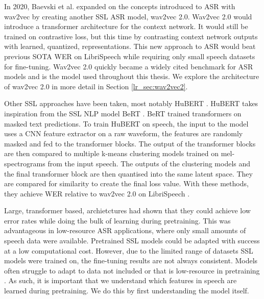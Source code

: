 In 2020, Baevski et al. \cite{wav2vec} expanded on the concepts introduced to ASR with wav2vec by creating another SSL ASR model, wav2vec 2.0. Wav2vec 2.0 would introduce a transformer architecture for the context network. It would still be trained on contrastive loss, but this time by contrasting context network outputs with learned, quantized, representations. This new approach to ASR would beat previous SOTA WER on LibriSpeech while requiring only small speech datasets for fine-tuning. Wav2vec 2.0 quickly became a widely cited benchmark for ASR models and is the model used throughout this thesis. We explore the architecture of wav2vec 2.0 in more detail in Section \ref{lr_sec:wav2vec2}.

Other SSL approaches have been taken, most notably HuBERT \cite{hsu2021hubert}. HuBERT takes inspiration from the SSL NLP model BeRT \cite{devlin-etal-2019-bert}. BeRT trained transformers on masked text predictions. To train HuBERT on speech, the input to the model uses a CNN feature extractor on a raw waveform, the features are randomly masked and fed to the transformer blocks. The output of the transformer blocks are then compared to multiple k-means clustering models trained on mel-spectrograms from the input speech. The outputs of the clustering models and the final transformer block are then quantised into the same latent space. They are compared for similarity to create the final loss value. With these methods, they achieve WER relative to wav2vec 2.0 on LibriSpeech \cite{librispeech}. 

Large, transformer based, archietctures had shown that they could achieve low error rates while doing the bulk of learning during pretraining. This was advantageous in low-resource ASR applications, where only small amounts of speech data were available. Pretrained SSL models could be adapted with success at a low computational cost. However, due to the limited range of datasets SSL models were trained on, the fine-tuning results are not always consistent. Models often struggle to adapt to data not included or that is low-resource in pretraining \cite{FLEURS_XLSR_WHISPER}. As such, it is important that we understand which features in speech are learned during pretraining. We do this by first understanding the model itself.




